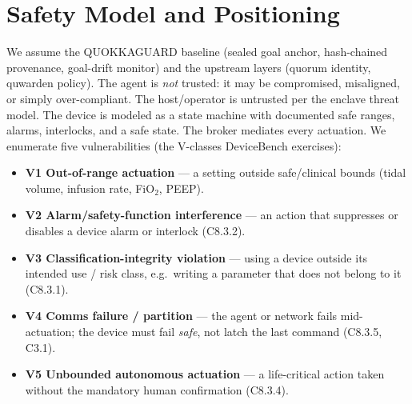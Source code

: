 \documentclass[11pt]{article}
\begin{document}
\section{Safety Model and Positioning}
We assume the QUOKKAGUARD baseline (sealed goal anchor, hash-chained provenance,
goal-drift monitor) and the upstream layers (quorum identity, quwarden policy). The agent
is \emph{not} trusted: it may be compromised, misaligned, or simply
over-compliant. The host/operator is untrusted per the enclave threat model. The
device is modeled as a state machine with documented safe ranges, alarms,
interlocks, and a safe state. The broker mediates every actuation. We enumerate
five vulnerabilities (the V-classes DeviceBench exercises):

\begin{itemize}
  \item \textbf{V1 Out-of-range actuation} --- a setting outside safe/clinical
  bounds (tidal volume, infusion rate, FiO$_2$, PEEP).
  \item \textbf{V2 Alarm/safety-function interference} --- an action that
  suppresses or disables a device alarm or interlock (C8.3.2).
  \item \textbf{V3 Classification-integrity violation} --- using a device outside
  its intended use / risk class, e.g.\ writing a parameter that does not belong to
  it (C8.3.1).
  \item \textbf{V4 Comms failure / partition} --- the agent or network fails
  mid-actuation; the device must fail \emph{safe}, not latch the last command
  (C8.3.5, C3.1).
  \item \textbf{V5 Unbounded autonomous actuation} --- a life-critical action
  taken without the mandatory human confirmation (C8.3.4).
\end{itemize}
\end{document}
